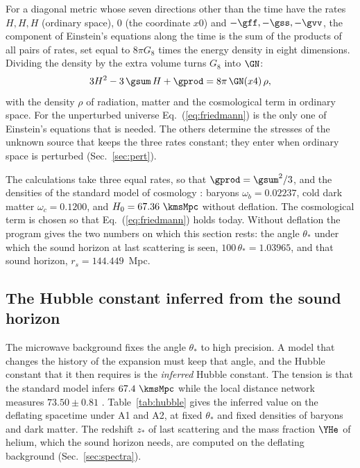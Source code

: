 For a diagonal metric whose seven directions other than the time have the rates $H,H,H$ (ordinary
space), $0$ (the coordinate $x0$) and $-\gff,-\gss,-\gvv$, the component of Einstein's equations
along the time is the sum of the products of all pairs of rates, set equal to $8\pi G_8$ times the
energy density in eight dimensions. Dividing the density by the extra volume turns $G_8$ into $\GN$:
\begin{equation}
3H^{2}-3\,\gsum\,H+\gprod=8\pi\,\GN(x4)\,\rho,
\label{eq:friedmann}
\end{equation}
with the density $\rho$ of radiation, matter and the cosmological term in ordinary space. For the
unperturbed universe Eq.~(\ref{eq:friedmann}) is the only one of Einstein's equations that is
needed. The others determine the stresses of the unknown source that keeps the three rates constant;
they enter when ordinary space is perturbed (Sec.~\ref{sec:pert}).

The calculations take three equal rates, so that $\gprod=\gsum^{2}/3$, and the densities of the
standard model of cosmology \cite{Planck2018VI}: baryons
$\omega_b=0.02237$, cold dark matter $\omega_c=0.1200$, and $H_0=67.36~\kmsMpc$ without deflation.
The cosmological term is chosen so that Eq.~(\ref{eq:friedmann}) holds today. Without deflation the
program gives the two numbers on which this section rests: the angle
$\theta_*$ under which the sound horizon at last scattering is seen, $100\,\theta_*=1.03965$, and
that sound horizon, $r_s=144.449$~Mpc.

\subsection{The Hubble constant inferred from the sound horizon}

The microwave background fixes the angle $\theta_*$ to high precision. A model that changes the history of the expansion must keep that angle,
and the Hubble constant that it then requires is the \emph{inferred} Hubble constant. The tension is
that the standard model infers $67.4~\kmsMpc$ \cite{Planck2018VI} while the local distance network
measures $73.50\pm0.81$ \cite{H0DN2026}. Table~\ref{tab:hubble} gives the inferred value on the
deflating spacetime under A1 and A2, at fixed $\theta_*$ and fixed densities of baryons and dark
matter. The redshift $z_*$ of last scattering and the mass fraction $\YHe$ of helium, which the sound
horizon needs, are computed on the deflating background (Sec.~\ref{sec:spectra}).

